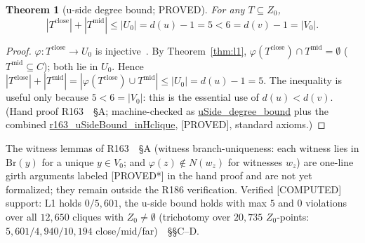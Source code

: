 \documentclass[11pt,a4paper]{article}
\newtheorem{theorem}{Theorem}
\theoremstyle{definition}
\begin{document}
\begin{theorem}[u-side degree bound; PROVED]
  \label{thm:ubound}
  For any $T\subseteq Z_0$,
  \begin{equation}
    \label{eq:ubound}
    |T^{\mathrm{close}}|+|T^{\mathrm{mid}}|\le|U_0|=d(u)-1=5<6=d(v)-1=|V_0|.
  \end{equation}
\end{theorem}
\begin{proof}
$\varphi:T^{\mathrm{close}}\to U_0$ is injective~\cite{R145}. By
Theorem~\ref{thm:l1}, $\varphi(T^{\mathrm{close}})\cap T^{\mathrm{mid}}
=\emptyset$ ($T^{\mathrm{mid}}\subseteq C$); both lie in $U_0$. Hence
$|T^{\mathrm{close}}|+|T^{\mathrm{mid}}|
=|\varphi(T^{\mathrm{close}})\cup T^{\mathrm{mid}}|\le|U_0|
=d(u)-1=5$. The inequality is useful only because
$5<6=|V_0|$: this is the essential use of $d(u)<d(v)$. (Hand proof
R163~\cite{R163}~\S A; machine-checked as
\url{uSide_degree_bound} plus the combined
\url{r163_uSideBound_inHclique}, [PROVED], standard axioms.)
\end{proof}

The witness lemmas of R163~\cite{R163}~\S A (witness branch-uniqueness:
each witness lies in $\mathrm{Br}(y)$ for a unique $y\in V_0$; and
$\varphi(z)\notin N(w_z)$ for witnesses $w_z$) are one-line girth
arguments labeled [PROVED*] in the hand proof and are not yet
formalized; they remain outside the R186 verification. Verified
[COMPUTED] support: L1 holds $0/5{,}601$, the u-side bound holds with
max $5$ and $0$ violations over all $12{,}650$ cliques with
$Z_0\neq\emptyset$ (trichotomy over $20{,}735$ $Z_0$-points:
$5{,}601/4{,}940/10{,}194$ close/mid/far)~\cite{R163}~\S\S C--D.
\end{document}
